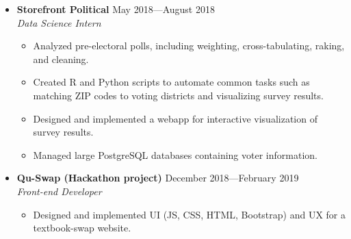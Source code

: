 \documentclass[12pt,letterpaper]{article}
\newenvironment{explist}
{\begin{itemize}[label=\textbf{--},itemsep=1pt,topsep=0pt,partopsep=0pt,parsep=0pt]}
{\end{itemize}}
\begin{document}
\begin{itemize}[label=,itemsep=0pt]
	\item
	\textbf{Storefront Political} \hfill May 2018---August 2018\\
	\textit{Data Science Intern}
	\begin{explist}
		\item Analyzed pre-electoral polls, including weighting, cross-tabulating, raking, and cleaning.
		\item Created R and Python scripts to automate common tasks such as matching ZIP codes to voting districts and visualizing survey results.
		\item Designed and implemented a webapp for interactive visualization of survey results.
		\item Managed large PostgreSQL databases containing voter information.
	\end{explist}

	\item
    \textbf{Qu-Swap (Hackathon project)} \hfill December 2018---February 2019\\
	\textit{Front-end Developer}
	\begin{explist}
		\item Designed and implemented UI (JS, CSS, HTML, Bootstrap) and UX for a textbook-swap website.
	\end{explist}

\end{itemize}
\end{document}
